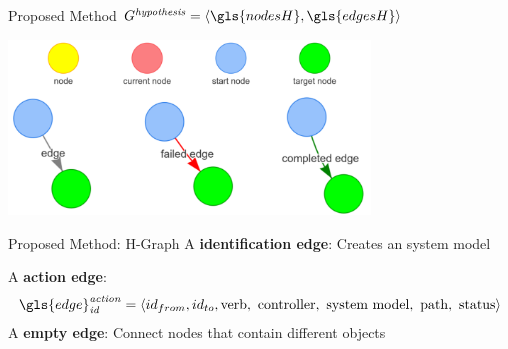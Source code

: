 \begin{frame}[fragile]{Proposed Method} 
$G^\mathit{hypothesis} = \left\langle \gls{nodesH}, \gls{edgesH} \right\rangle $
\vspace{0.5cm}
\begin{center}
\includegraphics[width=9.6cm]{figures/proposed_method/hgraph_legend}
\end{center}
\end{frame}




\begin{frame}[fragile]{Proposed Method: H-Graph} 
A \textbf{identification edge}: Creates an system model\bs

A \textbf{action edge}: \[\gls{edge}^\mathit{action}_\mathit{id} = \left\langle id_{from}, id_{to}, \textrm{verb}, \textrm{ controller},\textrm{ system model}, \textrm{ path}, \textrm{ status} \right\rangle\]\bs
A \textbf{empty edge}: Connect nodes that contain different objects\bs
\end{frame}

